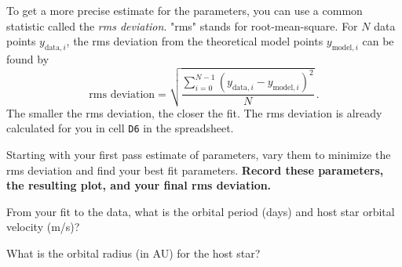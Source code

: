 To get a more precise estimate for the parameters, you can use a common statistic called the \textit{rms deviation}. "rms" stands for root-mean-square. For $N$ data points $y_{\textrm{data},i}$, the rms deviation from the theoretical model points $y_{\textrm{model},i}$ can be found by
\begin{equation}
 \textrm{rms deviation} = \sqrt{\dfrac{\sum_{i=0}^{N-1} \left( y_{\textrm{data},i} - y_{\textrm{model},i} \right)^2}{N}} \,.
\end{equation}
The smaller the rms deviation, the closer the fit. The rms deviation is already calculated for you in cell \texttt{D6} in the spreadsheet.

\begin{steps}
	\item Starting with your first pass estimate of parameters, vary them to minimize the rms deviation and find your best fit parameters. \textbf{Record these parameters, the resulting plot, and your final rms deviation.}
\end{steps}

%

\begin{steps}
	\item From your fit to the data, what is the orbital period (days) and host star orbital velocity (m/s)?
	
	\item What is the orbital radius (in AU) for the host star?
\end{steps}

